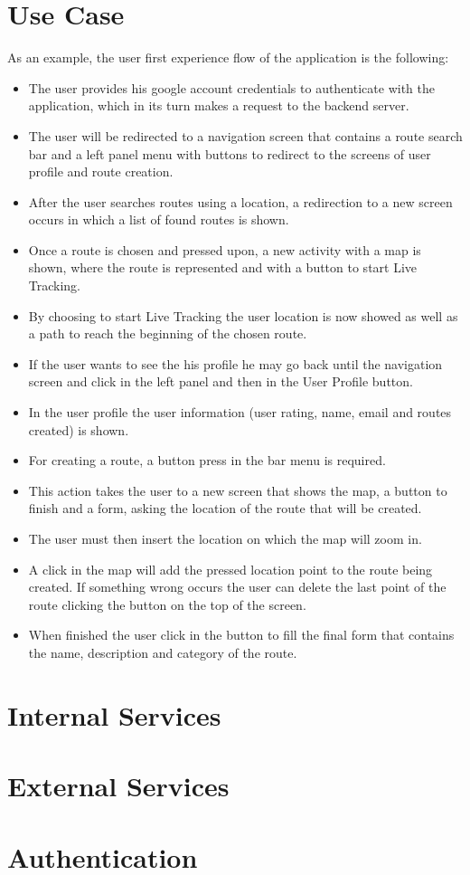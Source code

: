 \section*{Use Case}
As an example, the user first experience flow of the application is the following:
        \begin{itemize}
                \item The user provides his google account credentials to authenticate with the application, which in its turn makes a request to the backend server.
                \item The user will be redirected to a navigation screen that contains a route search bar and a left panel menu with buttons to redirect to the screens of user profile and route creation.
                \item After the user searches routes using a location, a redirection to a new screen occurs in which a list of found routes is shown.
                \item Once a route is chosen and pressed upon, a new activity with a map is shown, where the route is represented and with a button to start Live Tracking.
                \item By choosing to start Live Tracking the user location is now showed as well as a path to reach the beginning of the chosen route.
                \item If the user wants to see the his profile he may go back until the navigation screen and click in the left panel and then in the User Profile button.
                \item In the user profile the user information (user rating, name, email and routes created) is shown.
                \item For creating a route, a button press in the bar menu is required.
                \item This action takes the user to a new screen that shows the map, a button to finish and a form, asking the location of the route that will be created.
                \item The user must then insert the location on which the map will zoom in.
                \item A click in the map will add the pressed location point to the route being created. If something wrong occurs the user can delete the last point of the route clicking the button on the top of the screen.
                \item When finished the user click in the button to fill the final form that contains the name, description and category of the route.
        \end{itemize}

\section*{Internal Services}


\section*{External Services}


\section*{Authentication} \label{authentication}